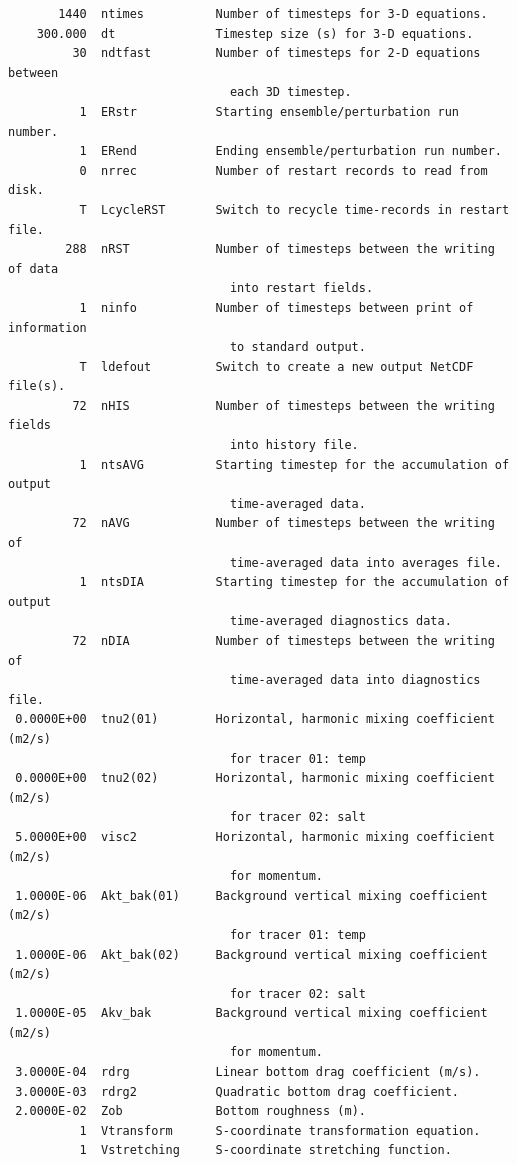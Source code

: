 \begin{verbatim}
       1440  ntimes          Number of timesteps for 3-D equations.
    300.000  dt              Timestep size (s) for 3-D equations.
         30  ndtfast         Number of timesteps for 2-D equations between
                               each 3D timestep.
          1  ERstr           Starting ensemble/perturbation run number.
          1  ERend           Ending ensemble/perturbation run number.
          0  nrrec           Number of restart records to read from disk.
          T  LcycleRST       Switch to recycle time-records in restart file.
        288  nRST            Number of timesteps between the writing of data
                               into restart fields.
          1  ninfo           Number of timesteps between print of information
                               to standard output.
          T  ldefout         Switch to create a new output NetCDF file(s).
         72  nHIS            Number of timesteps between the writing fields
                               into history file.
          1  ntsAVG          Starting timestep for the accumulation of output
                               time-averaged data.
         72  nAVG            Number of timesteps between the writing of
                               time-averaged data into averages file.
          1  ntsDIA          Starting timestep for the accumulation of output
                               time-averaged diagnostics data.
         72  nDIA            Number of timesteps between the writing of
                               time-averaged data into diagnostics file.
 0.0000E+00  tnu2(01)        Horizontal, harmonic mixing coefficient (m2/s)
                               for tracer 01: temp
 0.0000E+00  tnu2(02)        Horizontal, harmonic mixing coefficient (m2/s)
                               for tracer 02: salt
 5.0000E+00  visc2           Horizontal, harmonic mixing coefficient (m2/s)
                               for momentum.
 1.0000E-06  Akt_bak(01)     Background vertical mixing coefficient (m2/s)
                               for tracer 01: temp
 1.0000E-06  Akt_bak(02)     Background vertical mixing coefficient (m2/s)
                               for tracer 02: salt
 1.0000E-05  Akv_bak         Background vertical mixing coefficient (m2/s)
                               for momentum.
 3.0000E-04  rdrg            Linear bottom drag coefficient (m/s).
 3.0000E-03  rdrg2           Quadratic bottom drag coefficient.
 2.0000E-02  Zob             Bottom roughness (m).
          1  Vtransform      S-coordinate transformation equation.
          1  Vstretching     S-coordinate stretching function.

\end{verbatim}
